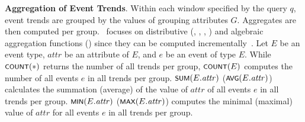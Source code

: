 \textbf{Aggregation of Event Trends}.
Within each window specified by the query $q$, event trends are grouped by the values of grouping attributes $G$. Aggregates are then computed per group. 
\app\ focuses on distributive (\mycount, \mymin, \mymax, \mysum) and algebraic aggregation functions (\myavg) since they can be computed incrementally~\cite{Gray97}. 
%
Let $E$ be an event type,
$\mathit{attr}$ be an attribute of $E$, and
$e$ be an event of type $E$.
%
While $\textsf{\footnotesize COUNT}(*)$ returns the number of all trends per group,
$\textsf{\footnotesize COUNT}(E)$ computes the number of all events $e$ in all trends per group. 
%
$\textsf{\footnotesize SUM}(E.\mathit{attr})$ ($\textsf{\footnotesize AVG}(E.\mathit{attr})$) calculates the summation (average) of the value of $\mathit{attr}$ of all events $e$ in all trends per group.
%
$\textsf{\footnotesize MIN}(E.\mathit{attr})$ ($\textsf{\footnotesize MAX}(E.\mathit{attr})$) computes the minimal (maximal) value of $\mathit{attr}$ for all events $e$ in all trends per group.






%

